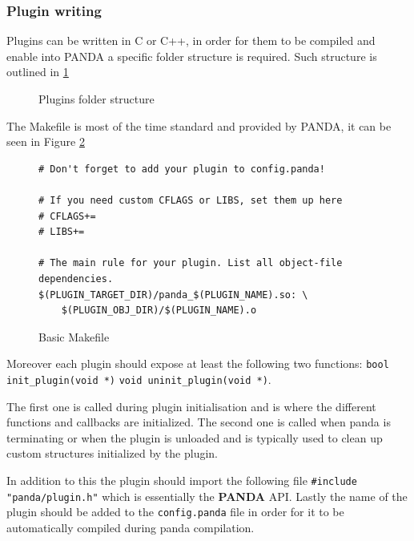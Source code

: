\subsubsection{Plugin writing}

Plugins can be written in C or C++, in order for them to be compiled and enable into PANDA a specific folder structure is required. Such structure is outlined in \ref{fig:plugs}

\begin{figure}[htp]
\centering
\begin{minipage}{\linewidth}
\end{minipage}
\caption{Plugins folder structure}
\label{fig:plugs}
\end{figure}

The Makefile is most of the time standard and provided by PANDA, it can be seen in Figure \ref{fig:mak}

\begin{figure}[htp]
\centering
\begin{minipage}{\linewidth}
\begin{lstlisting}
# Don't forget to add your plugin to config.panda!

# If you need custom CFLAGS or LIBS, set them up here
# CFLAGS+=
# LIBS+=

# The main rule for your plugin. List all object-file dependencies.
$(PLUGIN_TARGET_DIR)/panda_$(PLUGIN_NAME).so: \
	$(PLUGIN_OBJ_DIR)/$(PLUGIN_NAME).o
\end{lstlisting}
\end{minipage}
\caption{Basic Makefile}
\label{fig:mak}
\end{figure}

Moreover each plugin should expose at least the following two functions: \lstinline{bool init_plugin(void *)} \lstinline{void uninit_plugin(void *)}.

The first one is called during plugin initialisation and is where the different functions and callbacks are initialized. The second one is called when panda is terminating or when the plugin is unloaded and is typically used to clean up custom structures initialized by the plugin.

In addition to this the plugin should import the following file \lstinline{#include "panda/plugin.h"} which is essentially the \textbf{PANDA} API. Lastly the name of the plugin should be added to the \lstinline{config.panda} file in order for it to be automatically compiled during panda compilation.


